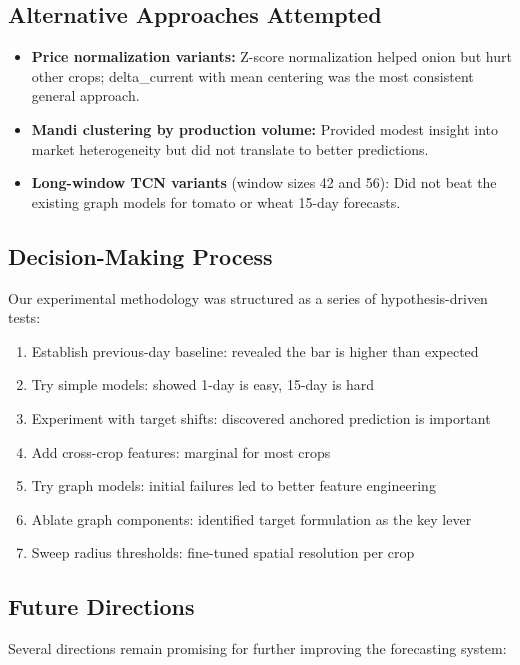 \documentclass[12pt,a4paper]{article}
\begin{document}
\subsection{Alternative Approaches Attempted}
\begin{itemize}
\item \textbf{Price normalization variants:} Z-score normalization helped onion but hurt other crops; delta\_current with mean centering was the most consistent general approach.
\item \textbf{Mandi clustering by production volume:} Provided modest insight into market heterogeneity but did not translate to better predictions.
\item \textbf{Long-window TCN variants} (window sizes 42 and 56): Did not beat the existing graph models for tomato or wheat 15-day forecasts.
\end{itemize}
\subsection{Decision-Making Process}
Our experimental methodology was structured as a series of hypothesis-driven tests:

\begin{enumerate}
\item Establish previous-day baseline: revealed the bar is higher than expected
\item Try simple models: showed 1-day is easy, 15-day is hard
\item Experiment with target shifts: discovered anchored prediction is important
\item Add cross-crop features: marginal for most crops
\item Try graph models: initial failures led to better feature engineering
\item Ablate graph components: identified target formulation as the key lever
\item Sweep radius thresholds: fine-tuned spatial resolution per crop
\end{enumerate}
\subsection{Future Directions}
Several directions remain promising for further improving the forecasting system:
\end{document}
